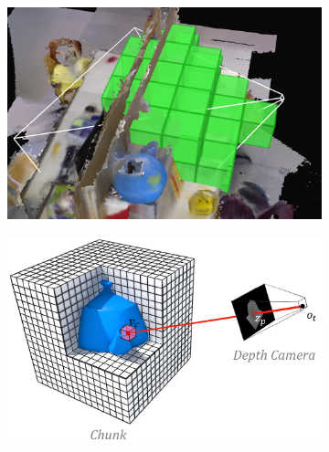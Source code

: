 \documentclass[10pt,twocolumn,letterpaper]{article}
\begin{document}
\begin{figure}
\begin{minipage} {0.25\linewidth}
\begin{subfigure}{1.0\linewidth}
		 \caption{} 
		 \label{fig:freiburg_2m}
	 \end{subfigure}  
	 \end{minipage}
    \begin{minipage}{0.25\linewidth}
	  \begin{subfigure}{\linewidth} \centering
	      \includegraphics[width=1.0\textwidth]{img/frustum_cull}
	      \caption{}
	 	 \label{fig:frustum_cull}
	  \end{subfigure}
	  \begin{subfigure}{\linewidth} \centering
	    \includegraphics[width=1.0\textwidth]{img/projection_mapping}
	      \caption{} 
	      \label{fig:projection_mapping}
	  \end{subfigure} 
\end{minipage}
     \begin{minipage}{0.23\linewidth}
 	  	\begin{subfigure}{\linewidth} \centering

\end{subfigure}
\end{minipage}
\end{figure}
\end{document}
